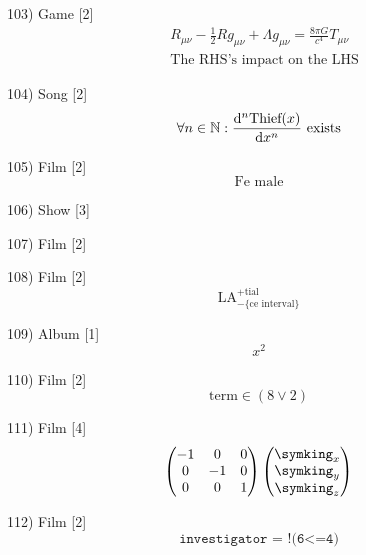 \documentclass[10pt]{article}
\begin{document}
    103) Game [2]
    \[
        \begin{split}
          &R_{\mu \nu} - \tfrac12 Rg_{\mu \nu} + \Lambda g_{\mu \nu} = \frac{8 \pi G}{c^4 }T_{\mu \nu} \\
          &\text{The RHS's impact on the LHS}
        \end{split}
    \]

    104) Song [2]
    \[
      \forall n \in \mathbb{N}:  \dv[n]{\text{Thief}(x)}{x} \text{ exists}
    \]
      
    105) Film [2]
    \[
        \text{Fe male}
    \]

    106) Show [3]
    \begin{figure}[htbp!]
    \end{figure}
    
    107) Film [2]
    \begin{figure}[htbp!]
    \end{figure}

    108) Film [2]
    \[
      \text{LA}^{+ \text{tial}}_{-\text{\{ce interval\}}}
    \]

    109) Album [1]
    \[
      x^2
    \]
    
    110) Film [2]
    \[
      \text{term} \in (8  \lor 2)
    \]

    111) Film [4]
    \[
        \begin{pmatrix}
          -1 & 0 & 0 \\
          0 & -1 & 0 \\
          0 & 0  & 1 \\
        \end{pmatrix}
    		\begin{pmatrix} 
					\text{\symking}_x  \\    
   				\text{\symking}_y  \\
					\text{\symking}_z
				\end{pmatrix}
\]

    112) Film [2]
    \[
      \texttt{investigator = !(6<=4)}
    \]
\end{document}
